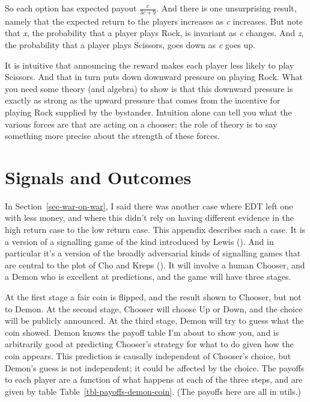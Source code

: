 \documentclass[
  12pt,
  letterpaper,
  DIV=11,
  numbers=noendperiod]{scrreprt}
\begin{document}
So each option has expected payout \(\frac{c}{3c+9}\). And there is one
unsurprising result, namely that the expected return to the players
increases as \emph{c} increases. But note that \emph{x}, the probability
that a player plays Rock, is invariant as \emph{c} changes. And
\emph{z}, the probability that a player plays Scissors, goes down as
\emph{c} goes up.

It is intuitive that announcing the reward makes each player less likely
to play Scissors. And that in turn puts down downward pressure on
playing Rock. What you need some theory (and algebra) to show is that
this downward pressure is exactly as strong as the upward pressure that
comes from the incentive for playing Rock supplied by the bystander.
Intuition alone can tell you what the various forces are that are acting
on a chooser; the role of theory is to say something more precise about
the strength of these forces.

\chapter{Signals and Outcomes}\label{sec-war-signal}

In Section~\ref{sec-war-on-war}, I said there was another case where EDT
left one with less money, and where this didn't rely on having different
evidence in the high return case to the low return case. This appendix
describes such a case. It is a version of a signalling game of the kind
introduced by Lewis (). And in particular
it's a version of the broadly adversarial kinds of signalling games that
are central to the plot of Cho and Kreps
(). It will involve a human Chooser,
and a Demon who is excellent at predictions, and the game will have
three stages.

At the first stage a fair coin is flipped, and the result shown to
Chooser, but not to Demon. At the second stage, Chooser will choose Up
or Down, and the choice will be publicly announced. At the third stage,
Demon will try to guess what the coin showed. Demon knows the payoff
table I'm about to show you, and is arbitrarily good at predicting
Chooser's strategy for what to do given how the coin appears. This
prediction is causally independent of Chooser's choice, but Demon's
guess is not independent; it could be affected by the choice. The
payoffs to each player are a function of what happens at each of the
three steps, and are given by table Table~\ref{tbl-payoffs-demon-coin}.
(The payoffs here are all in utils.)
\end{document}
